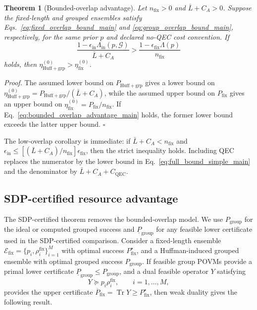 \documentclass[
 reprint,
 amsmath,amssymb,
 aps,
 pra,
 floatfix,
]{revtex4-2}
\newtheorem{theorem}{Theorem}
\begin{document}
\begin{theorem}[Bounded-overlap advantage]\label{thm:bounded-overlap}
Let $n_{\mathrm{fix}}>0$ and $\bar L+C_A>0$. Suppose the fixed-length and grouped ensembles satisfy Eqs.~\eqref{eq:fixed_overlap_bound_main} and \eqref{eq:group_overlap_bound_main}, respectively, for the same prior $p$ and declared no-QEC cost convention. If
\begin{equation}
    \frac{1-\epsilon_{\mathrm{in}}\Lambda_{\mathrm{in}}(p,\mathcal G)}{\bar L+C_A}
    >
    \frac{1-\epsilon_{\mathrm{fix}}\Lambda(p)}{n_{\mathrm{fix}}}
    \label{eq:bounded_overlap_advantage_main}
\end{equation}
holds, then $\eta_{\mathrm{Huff+grp}}^{(0)}>\eta_{\mathrm{fix}}^{(0)}$.
\end{theorem}
\textit{Proof.} The assumed lower bound on $P_{\mathrm{Huff+grp}}$ gives a lower bound on $\eta_{\mathrm{Huff+grp}}^{(0)}=P_{\mathrm{Huff+grp}}/(\bar L+C_A)$, while the assumed upper bound on $P_{\mathrm{fix}}$ gives an upper bound on $\eta_{\mathrm{fix}}^{(0)}=P_{\mathrm{fix}}/n_{\mathrm{fix}}$. If Eq.~\eqref{eq:bounded_overlap_advantage_main} holds, the former lower bound exceeds the latter upper bound. \(\square\)

The low-overlap corollary is immediate: if $\bar L+C_A<n_{\mathrm{fix}}$ and $\epsilon_{\mathrm{in}}\le[(\bar L+C_A)/n_{\mathrm{fix}}]\epsilon_{\mathrm{fix}}$, then the strict inequality holds. Including QEC replaces the numerator by the lower bound in Eq.~\eqref{eq:full_bound_simple_main} and the denominator by $\bar L+C_A+C_{\mathrm{QEC}}$.

\subsection{SDP-certified resource advantage}

The SDP-certified theorem removes the bounded-overlap model. We use $P_{\mathrm{group}}$ for the ideal or computed grouped success and $\underline P_{\mathrm{group}}$ for any feasible lower certificate used in the SDP-certified comparison. Consider a fixed-length ensemble $\mathcal E_{\mathrm{fix}}=\{p_i,\rho_i^{\mathrm{fix}}\}_{i=1}^M$ with optimal success $P^\star_{\mathrm{fix}}$, and a Huffman-induced grouped ensemble with optimal grouped success $P_{\mathrm{group}}$. If feasible group POVMs provide a primal lower certificate $\underline P_{\mathrm{group}}\le P_{\mathrm{group}}$, and a dual feasible operator $Y$ satisfying
\begin{equation}
    Y\succeq p_i\rho_i^{\mathrm{fix}},\qquad i=1,\ldots,M,
\end{equation}
provides the upper certificate $\overline P_{\mathrm{fix}}=\operatorname{Tr}Y\ge P^\star_{\mathrm{fix}}$, then weak duality gives the following result.
\end{document}
